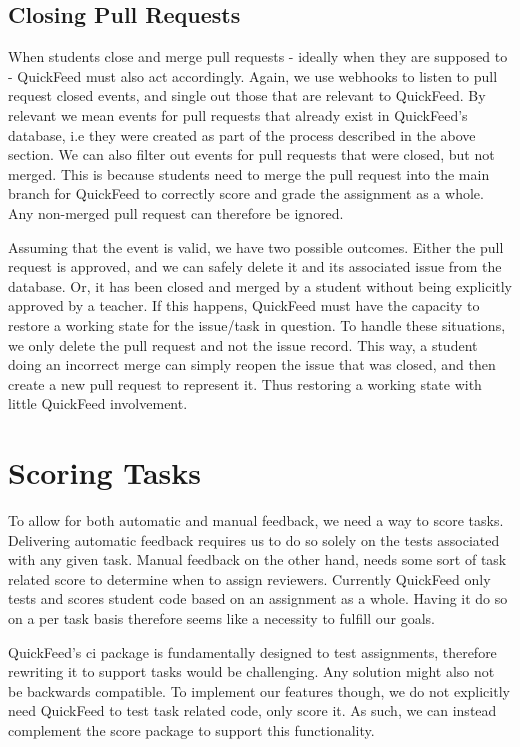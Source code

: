 \subsection{Closing Pull Requests}

When students close and merge pull requests - ideally when they are supposed to - QuickFeed must also act accordingly.
Again, we use webhooks to listen to pull request closed events, and single out those that are relevant to QuickFeed.
By relevant we mean events for pull requests that already exist in QuickFeed's database, i.e they were created as part of the process described in the above section.
We can also filter out events for pull requests that were closed, but not merged.
This is because students need to merge the pull request into the main branch for QuickFeed to correctly score and grade the assignment as a whole.
Any non-merged pull request can therefore be ignored.

Assuming that the event is valid, we have two possible outcomes.
Either the pull request is approved, and we can safely delete it and its associated issue from the database.
Or, it has been closed and merged by a student without being explicitly approved by a teacher.
If this happens, QuickFeed must have the capacity to restore a working state for the issue/task in question.
To handle these situations, we only delete the pull request and not the issue record.
This way, a student doing an incorrect merge can simply reopen the issue that was closed, and then create a new pull request to represent it.
Thus restoring a working state with little QuickFeed involvement.

\section{Scoring Tasks}

To allow for both automatic and manual feedback, we need a way to score tasks.
Delivering automatic feedback requires us to do so solely on the tests associated with any given task.
Manual feedback on the other hand, needs some sort of task related score to determine when to assign reviewers.
Currently QuickFeed only tests and scores student code based on an assignment as a whole.
Having it do so on a per task basis therefore seems like a necessity to fulfill our goals.

QuickFeed's ci package is fundamentally designed to test assignments, therefore rewriting it to support tasks would be challenging.
Any solution might also not be backwards compatible.
To implement our features though, we do not explicitly need QuickFeed to test task related code, only score it.
As such, we can instead complement the score package to support this functionality.

